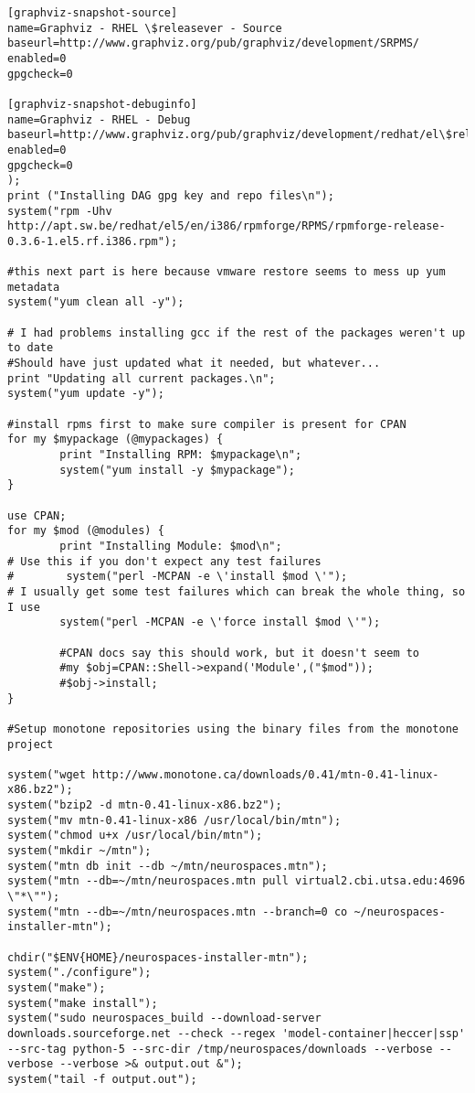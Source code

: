 \documentclass[12pt]{article}
\begin{document}
\begin{verbatim}
[graphviz-snapshot-source]
name=Graphviz - RHEL \$releasever - Source
baseurl=http://www.graphviz.org/pub/graphviz/development/SRPMS/
enabled=0
gpgcheck=0

[graphviz-snapshot-debuginfo]
name=Graphviz - RHEL - Debug
baseurl=http://www.graphviz.org/pub/graphviz/development/redhat/el\$releasever/\$basearch/debug/
enabled=0
gpgcheck=0
);
print ("Installing DAG gpg key and repo files\n");
system("rpm -Uhv http://apt.sw.be/redhat/el5/en/i386/rpmforge/RPMS/rpmforge-release-0.3.6-1.el5.rf.i386.rpm");

#this next part is here because vmware restore seems to mess up yum metadata
system("yum clean all -y");

# I had problems installing gcc if the rest of the packages weren't up to date
#Should have just updated what it needed, but whatever...
print "Updating all current packages.\n";
system("yum update -y");

#install rpms first to make sure compiler is present for CPAN
for my $mypackage (@mypackages) {
        print "Installing RPM: $mypackage\n";
        system("yum install -y $mypackage");
}

use CPAN;
for my $mod (@modules) {
        print "Installing Module: $mod\n";
# Use this if you don't expect any test failures
#        system("perl -MCPAN -e \'install $mod \'");
# I usually get some test failures which can break the whole thing, so I use
        system("perl -MCPAN -e \'force install $mod \'");

        #CPAN docs say this should work, but it doesn't seem to
        #my $obj=CPAN::Shell->expand('Module',("$mod"));
        #$obj->install;
}

#Setup monotone repositories using the binary files from the monotone project

system("wget http://www.monotone.ca/downloads/0.41/mtn-0.41-linux-x86.bz2");
system("bzip2 -d mtn-0.41-linux-x86.bz2");
system("mv mtn-0.41-linux-x86 /usr/local/bin/mtn");
system("chmod u+x /usr/local/bin/mtn");
system("mkdir ~/mtn");
system("mtn db init --db ~/mtn/neurospaces.mtn");
system("mtn --db=~/mtn/neurospaces.mtn pull virtual2.cbi.utsa.edu:4696 \"*\"");
system("mtn --db=~/mtn/neurospaces.mtn --branch=0 co ~/neurospaces-installer-mtn");

chdir("$ENV{HOME}/neurospaces-installer-mtn");
system("./configure");
system("make");
system("make install");
system("sudo neurospaces_build --download-server downloads.sourceforge.net --check --regex 'model-container|heccer|ssp' --src-tag python-5 --src-dir /tmp/neurospaces/downloads --verbose --verbose --verbose >& output.out &");
system("tail -f output.out");
\end{verbatim}
\end{document}
